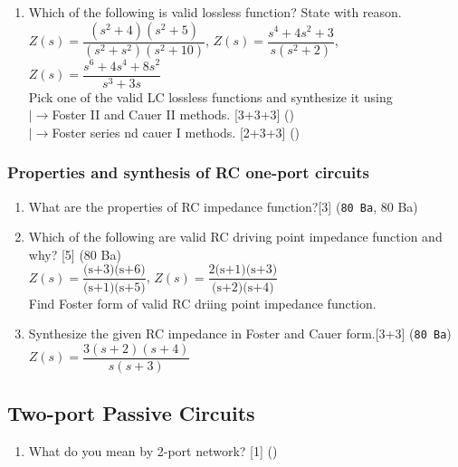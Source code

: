 \documentclass[12pt]{article}
\newcommand{\lb}{\\$\left|\rightarrow\right.$}
\begin{document}
\begin{enumerate}
	\item Which of the following is valid lossless function? State with reason. \\
	$Z(s) = \dfrac{(s^2+4)(s^2+5)}{(s^2+s^2)(s^2+10)}$, \hspace{1cm} $Z(s)= \dfrac{s^4+4s^2+3}{s(s^2+2)}$, \hspace{1cm} $Z(s) = \dfrac{s^6+4s^4+8s^2}{s^3+3s}$\\
	Pick one of the valid LC lossless functions and synthesize it using
	\lb Foster II and Cauer II methods. \hfill [3+3+3] ()
	\lb Foster series nd cauer I methods. \hfill [2+3+3] ()
\end{enumerate}

\subsubsection{Properties and synthesis of RC one-port circuits}
\begin{enumerate}
	\item What are the properties of RC impedance function?\hfill [3] (\texttt{80 Ba}, 80 Ba)
	
	\item Which of the following are valid RC driving point impedance function and why? \hfill [5] (80 Ba)\\
	$Z(s) = \dfrac{\text{(s+3)(s+6)}}{\text{(s+1)(s+5)}}$, \hspace{1cm} $Z(s) = \dfrac{\text{2(s+1)(s+3)}}{\text{(s+2)(s+4)}}$\\
	Find Foster form of valid RC driing point impedance function.
	
	\item Synthesize the given RC impedance in Foster and Cauer form.\hfill[3+3] (\texttt{80 Ba})\\
$Z(s) = \dfrac{3(s+2)(s+4)}{s(s+3)}$
\end{enumerate}

\subsection{Two-port Passive Circuits}
\begin{enumerate}[noitemsep, topsep=0pt]
	\item What do you mean by 2-port network? \hfill [1] () 
\end{enumerate}
\end{document}
